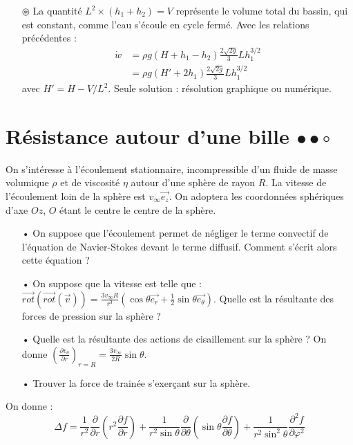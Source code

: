 \documentclass{report}
\begin{document}
\begin{itemize}
	\item[$\circledast$] La quantité $L^2\times(h_1+h_2)=V$ représente le volume total du bassin, qui est constant, comme l'eau s'écoule en cycle fermé. Avec les relations précédentes :
	\begin{align*}
		\dot{w}&=\rho g(H+h_1-h_2)\frac{2\sqrt{2g}}{3}Lh_1^{3/2}\\
		&=\rho g(H'+2h_1)\frac{2\sqrt{2g}}{3}Lh_1^{3/2}
	\end{align*}
	avec $H'=H-V/L^2$. Seule solution : résolution graphique ou numérique.

\end{itemize}

\newpage

\section*{Résistance autour d'une bille $\bullet\bullet\circ$}

On s'intéresse à l'écoulement stationnaire, incompressible d'un fluide de masse volumique $\rho$ et de viscosité $\eta$ autour d'une sphère de rayon $R$. La vitesse de l'écoulement loin de la sphère est $v_\infty\vec{e_z}$. On adoptera les coordonnées sphériques d'axe $Oz$, $O$ étant le centre le centre de la sphère. 

\begin{itemize}
	\item[•] On suppose que l'écoulement permet de négliger le terme convectif de l'équation de Navier-Stokes devant le terme diffusif. Comment s'écrit alors cette équation ? 
	\item[•] On suppose que la vitesse est telle que : $\vec{rot}(\vec{rot}(\vec{v}))=\frac{3v_\infty R}{r^3}\left(\cos\theta\vec{e_r}+\frac{1}{2}\sin\theta\vec{e_\theta} \right) $. Quelle est la résultante des forces de pression sur la sphère ? 
	\item[•] Quelle est la résultante des actions de cisaillement sur la sphère ? On donne $\left(\frac{\partial v_\theta}{\partial r}\right)_{r=R}=\frac{3v_\infty}{2R}\sin\theta  $.
	\item[•] Trouver la force de trainée s'exerçant sur la sphère. 
\end{itemize}

On donne : 
\begin{equation}
	\Delta f = \frac{1}{r^2}\frac{\partial}{\partial r} \left(r^2\frac{\partial f}{\partial r} \right) + \frac{1}{r^2\sin\theta}\frac{\partial}{\partial \theta} \left(\sin\theta\frac{\partial f}{\partial \theta} \right) + \frac{1}{r^2\sin^2\theta}\frac{\partial^2 f}{\partial \varphi^2} 
\end{equation}
\end{document}
